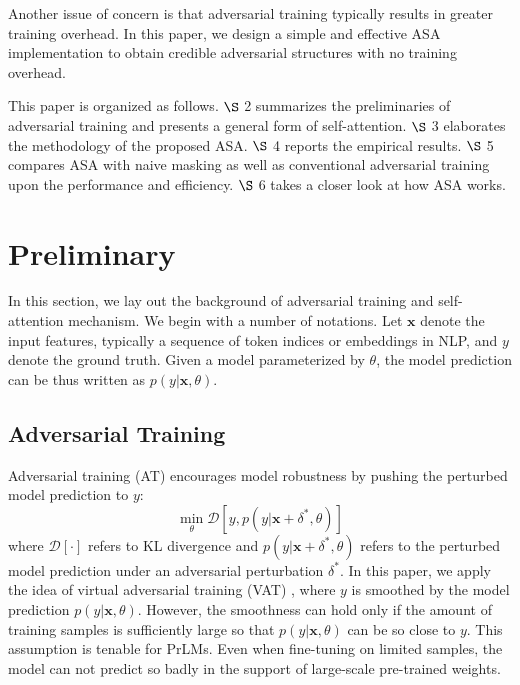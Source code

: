 \documentclass[letterpaper]{article} \usepackage{aaai23}  \usepackage{times}  \usepackage{helvet}  \usepackage{courier}  \usepackage[hyphens]{url}  \usepackage{graphicx} \urlstyle{rm} \def\UrlFont{\rm}  \usepackage{natbib}  \usepackage{caption} \frenchspacing  \setlength{\pdfpagewidth}{8.5in}  \setlength{\pdfpageheight}{11in}  \usepackage{algorithm}
\begin{document}
Another issue of concern is that adversarial training typically results in greater training overhead. In this paper, we design a simple and effective ASA implementation to obtain credible adversarial structures with no training overhead.

This paper is organized as follows. $\S$ 2 summarizes the preliminaries of adversarial training and presents a general form of self-attention. $\S$ 3 elaborates the methodology of the proposed ASA. $\S$ 4 reports the empirical results. $\S$ 5 compares ASA with naive masking as well as conventional adversarial training upon the performance and efficiency. $\S$ 6 takes a closer look at how ASA works.


\section{Preliminary}
\label{s2}

In this section, we lay out the background of adversarial training and self-attention mechanism. We begin with a number of notations. Let $ \mathbf x $ denote the input features, typically a sequence of token indices or embeddings in NLP, and $ y $ denote the ground truth. Given a model parameterized by $ \theta $, the model prediction can be thus written as $ p(y|\mathbf x,\theta) $.

\subsection{Adversarial Training}

Adversarial training (AT) \citep{DBLP:journals/corr/GoodfellowSS14} encourages model robustness by pushing the perturbed model prediction to $ y $:
\begin{equation}
\mathop{\min}_\theta \mathcal D \left[y,p(y|\mathbf x+\delta^*,\theta)\right]
\label{e1}
\end{equation}
where $ \mathcal D [\cdot] $ refers to KL divergence and $ p(y|\mathbf x+\delta^*,\theta) $ refers to the perturbed model prediction under an adversarial perturbation $ \delta^* $. In this paper, we apply the idea of virtual adversarial training (VAT) \citep{DBLP:journals/pami/MiyatoMKI19}, where $ y $ is smoothed by the model prediction $ p(y|\mathbf x,\theta) $. However, the smoothness can hold only if the amount of training samples is sufficiently large so that $ p(y|\mathbf x,\theta) $ can be so close to $ y $. This assumption is tenable for PrLMs. Even when fine-tuning on limited samples, the model can not predict so badly in the support of large-scale pre-trained weights.
\end{document}
